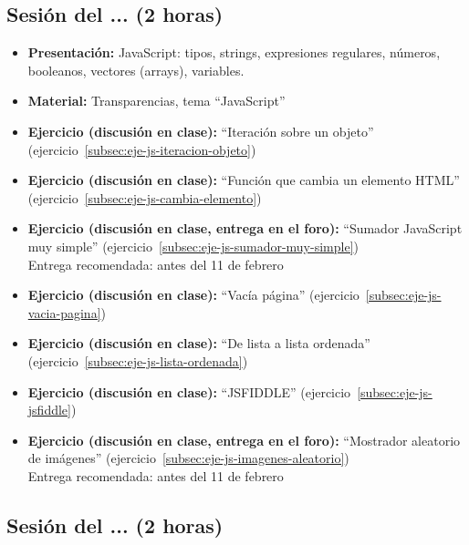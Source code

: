 \documentclass[a4paper,12pt]{report}
\begin{document}
\subsection{Sesión del ... (2 horas)}

\begin{itemize}
\item \textbf{Presentación:} JavaScript: tipos, strings, expresiones regulares, números, booleanos, vectores (arrays), variables.
\item \textbf{Material:} Transparencias, tema ``JavaScript''
\item \textbf{Ejercicio (discusión en clase):} ``Iteración sobre un objeto'' (ejercicio~\ref{subsec:eje-js-iteracion-objeto})
\item \textbf{Ejercicio (discusión en clase):} ``Función que cambia un elemento HTML'' (ejercicio~\ref{subsec:eje-js-cambia-elemento})
\item \textbf{Ejercicio (discusión en clase, entrega en el foro):} ``Sumador JavaScript muy simple'' (ejercicio~\ref{subsec:eje-js-sumador-muy-simple}) \\
  Entrega recomendada: antes del 11 de febrero
\item \textbf{Ejercicio (discusión en clase):} ``Vacía página'' (ejercicio~\ref{subsec:eje-js-vacia-pagina})
\item \textbf{Ejercicio (discusión en clase):} ``De lista a lista ordenada'' (ejercicio~\ref{subsec:eje-js-lista-ordenada})
\item \textbf{Ejercicio (discusión en clase):} ``JSFIDDLE'' (ejercicio~\ref{subsec:eje-js-jsfiddle})
\item \textbf{Ejercicio (discusión en clase, entrega en el foro):} ``Mostrador aleatorio de imágenes'' (ejercicio~\ref{subsec:eje-js-imagenes-aleatorio}) \\
  Entrega recomendada: antes del 11 de febrero
\end{itemize}


\subsection{Sesión del ... (2 horas)}
\end{document}
